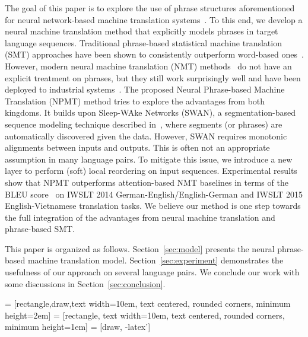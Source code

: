 \documentclass{article}
\begin{document}
The goal of this paper is to explore the use of phrase structures aforementioned
for neural network-based machine translation
systems~\citep{Sutskever:2014,Bahdanau:2014}.
To this end, we develop a neural machine translation method that explicitly
models phrases in target language sequences. Traditional
phrase-based statistical machine translation (SMT) approaches have been shown to
consistently outperform word-based
ones~\citep{koehn2003statistical,koehn2009statistical,lopez2008statistical}. However, modern neural machine translation (NMT)
methods~\citep{Sutskever:2014,Bahdanau:2014,luong2015effective} do not have an
explicit treatment on phrases, but they still work surprisingly well and have
been deployed to industrial systems~\citep{TACL863,wu2016google}. 
The proposed Neural Phrase-based Machine Translation (NPMT) method tries to
explore the advantages from both kingdoms. It builds upon Sleep-WAke Networks
(SWAN), a segmentation-based sequence modeling technique described
in~\cite{wang2017sequence}, where segments (or phrases) are automatically
discovered given the data. However, SWAN requires monotonic alignments between
inputs and outputs. This is often not an appropriate assumption in many language
pairs. To mitigate this issue, we introduce a new layer to perform (soft) local
reordering on input sequences. Experimental results show that NPMT outperforms
attention-based NMT baselines in terms of the BLEU
score~\citep{papineni2002bleu} on IWSLT 2014 German-English/English-German and
IWSLT 2015 English-Vietnamese translation tasks. We believe our method is one
step towards the full integration of the advantages from neural machine
translation and phrase-based SMT.

This paper is organized as follows. Section~\ref{sec:model} presents the neural
phrase-based machine translation model. Section~\ref{sec:experiment}
demonstrates the usefulness of our approach on several language pairs. We
conclude our work with some discussions in Section~\ref{sec:conclusion}.

 = [rectangle,draw,text width=10em, text centered, rounded corners, minimum height=2em]
 = [rectangle, text width=10em, text centered, rounded corners, minimum height=1em]
 = [draw, -latex']
\end{document}
